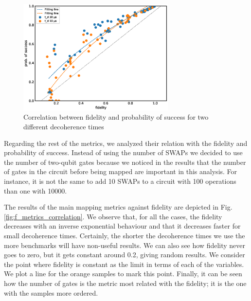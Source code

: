 \begin{figure}[htbp]
\centering
\includegraphics[width=0.7\textwidth]{figures/f_ps_correlation.eps}
\caption{\label{fig:f_ps_correlation_with_meas_error}
Correlation between fidelity and probability of success for two different decoherence times}
\end{figure}



Regarding the rest of the metrics, we analyzed their relation with the fidelity and probability of success.
Instead of using the number of SWAPs we decided to use the number of two-qubit gates because we noticed in the results that the number of gates in the circuit before being mapped are important in this analysis.
For instance, it is not the same to add 10 SWAPs to a circuit with 100 operations than one with 10000.


The results of the main mapping metrics against fidelity are depicted in Fig. \ref{fig:f_metrics_correlation}.
We observe that, for all the cases, the fidelity decreases with an inverse exponential behaviour and that it decreases faster for small decoherence times.
Certainly, the shorter the decoherence times we use the more benchmarks will have non-useful results.
We can also see how fidelity never goes to zero, but it gets constant around 0.2, giving random results.
We consider the point where fidelity is constant as the limit in terms of each of the variables.
We plot a line for the orange samples to mark this point.
Finally, it can be seen how the number of gates is the metric most related with the fidelity; it is the one with the samples more ordered.

